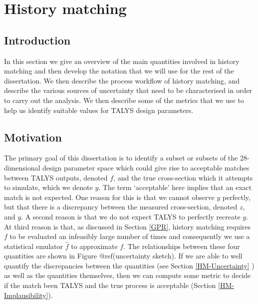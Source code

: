 \documentclass[
  12pt,
  a4paper,
  twoside]{book}
\begin{document}
\hypertarget{History-Matching}{%
\chapter{History matching}\label{History-Matching}}

\hypertarget{HM-Intro}{%
\section{Introduction}\label{HM-Intro}}

In this section we give an overview of the main quantities involved in history matching and then develop the notation that we will use for the rest of the dissertation. We then describe the process workflow of history matching, and describe the various sources of uncertainty that need to be characterised in order to carry out the analysis. We then describe some of the metrics that we use to help us identify suitable values for TALYS design parameters.

\hypertarget{motivation}{%
\section{Motivation}\label{motivation}}

The primary goal of this dissertation is to identify a subset or subsets of the 28-dimensional design parameter space which could give rise to acceptable matches between TALYS outputs, denoted \(f\), and the true cross-section which it attempts to simulate, which we denote \(y\). The term `acceptable' here implies that an exact match is not expected. One reason for this is that we cannot observe \(y\) perfectly, but that there is a discrepancy between the measured cross-section, denoted \(z\), and \(y\). A second reason is that we do not expect TALYS to perfectly recreate \(y\). At third reason is that, as discussed in Section \ref{GPR}, history matching requires \(f\) to be evaluated an infeasibly large number of times and consequently we use a statistical emulator \(\hat{f}\) to approximate \(f\). The relationships between these four quantities are shown in Figure @ref(uncertainty sketch). If we are able to well quantify the discrepancies between the quantities (see Section \ref{HM-Uncertainty} ) as well as the quantities themselves, then we can compute some metric to decide if the match been TALYS and the true process is acceptable (Section \ref{HM-Implausibility}).
\end{document}

